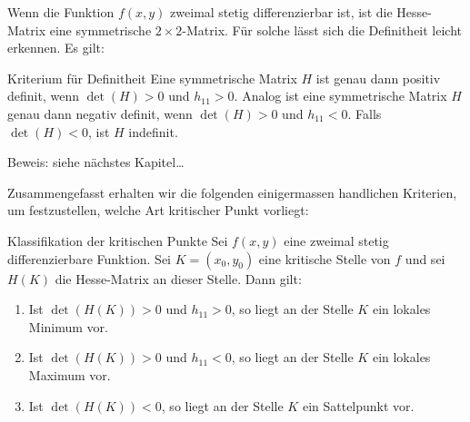 Wenn die Funktion \(f(x,y)\) zweimal stetig differenzierbar ist, ist die Hesse-Matrix eine symmetrische \(2 \times 2\)-Matrix. Für solche lässt sich die Definitheit leicht erkennen. Es gilt:
\begin{satz}
	{Kriterium für Definitheit}{}
	Eine symmetrische Matrix \(H\) ist genau dann positiv definit, wenn \(\det(H) > 0\) und \(h_{11} > 0\). Analog ist eine symmetrische Matrix \(H\) genau dann negativ definit, wenn \(\det(H) > 0\) und \(h_{11} < 0\). Falls \(\det(H) < 0\), ist \(H\) indefinit.
\end{satz}

Beweis: siehe nächstes Kapitel\dots



Zusammengefasst erhalten wir die folgenden einigermassen handlichen Kriterien, um festzustellen, welche Art kritischer Punkt vorliegt:
\begin{satz}
	{Klassifikation der kritischen Punkte}{}
	Sei \(f(x,y)\) eine zweimal stetig differenzierbare Funktion. Sei \(K = (x_0,y_0)\) eine kritische Stelle von \(f\) und sei \(H(K)\) die Hesse-Matrix an dieser Stelle. Dann gilt:
	\begin{enumerate}
		\item Ist \(\det(H(K)) > 0\) und \(h_{11} > 0\), so liegt an der Stelle \(K\) ein lokales Minimum vor.
		\item Ist \(\det(H(K)) > 0\) und \(h_{11} < 0\), so liegt an der Stelle \(K\) ein lokales Maximum vor.
		\item Ist \(\det(H(K)) < 0\), so liegt an der Stelle \(K\) ein Sattelpunkt vor.
	\end{enumerate}
\end{satz}

